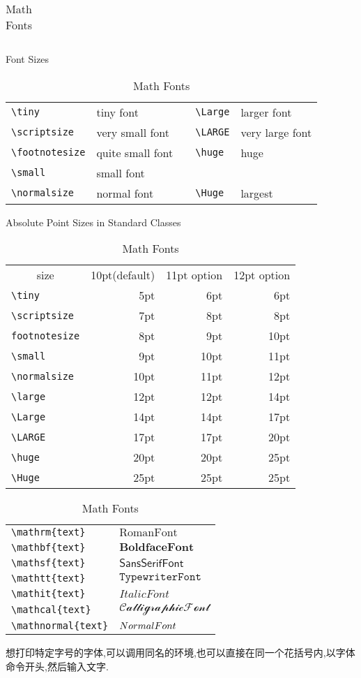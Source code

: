 \documentclass[a4paper,11pt]{article}%
\begin{document}
\begin{table}[htp]
\begin{tabular}{llcll}
\end{tabular}
\caption{Font Sizes}
\begin{tabular}{llcll}
    \hline
    \verb+\tiny+ & \tiny{tiny font} & \quad & \verb+\Large+ & \Large{larger font} \\
    \verb+\scriptsize+ & \scriptsize{very small font} & \quad & \verb+\LARGE+ & \LARGE{very large font} \\
    \verb+\footnotesize+ & \footnotesize{quite small font} & \quad & \verb+\huge+ & \huge{huge} \\
    \verb+\small+ & \small{small font} & \quad &  &  \\
    \verb+\normalsize+ & \normalsize{normal font} & \quad & \verb+\Huge+ & \Huge{largest} \\
    \hline
\end{tabular}
\caption{Absolute Point Sizes in Standard Classes}
\begin{tabular}{lrrr}
    \hline 
    \multicolumn{1}{c}{size} & 10pt(default) & 11pt option & 12pt option \\
    \verb+\tiny+ & 5pt & 6pt & 6pt \\
    \verb|\scriptsize| & 7pt & 8pt & 8pt \\
    \verb|footnotesize| & 8pt & 9pt & 10pt \\
    \verb|\small| & 9pt & 10pt & 11pt \\
    \verb|\normalsize| & 10pt & 11pt &12pt \\
    \verb|\large| & 12pt & 12pt & 14pt \\
    \verb|\Large| &14pt &14pt & 17pt \\
    \verb|\LARGE| & 17pt & 17pt & 20pt \\
    \verb|\huge| & 20pt & 20pt &25pt    \\
    \verb|\Huge| & 25pt & 25pt & 25pt\\
    \hline
\end{tabular}
\caption{Math Fonts}
\begin{tabular}{ll}
\hline
\verb|\mathrm{text}| & $\mathrm{Roman Font}$ \\
\verb|\mathbf{text}| & $\mathbf{Boldface Font}$ \\
\verb|\mathsf{text}| & $\mathsf{Sans Serif Font} $\\
\verb|\mathtt{text}| & $\mathtt{Typewriter Font}$ \\
\verb|\mathit{text}| & $\mathit{Italic Font}$ \\
\verb|\mathcal{text}| &$ \mathcal{Calligraphic Font}$ \\
\verb|\mathnormal{text}| & $\mathnormal{Normal Font} $\\
\hline
\end{tabular}
\end{table}
想打印特定字号的字体,可以调用同名的环境,也可以直接在同一个花括号内,以字体命令开头,然后输入文字.
\end{document}
